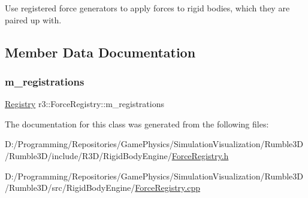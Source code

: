 Use registered force generators to apply forces to rigid bodies, which they are paired up with. 



\subsection{Member Data Documentation}
\mbox{\label{classr3_1_1_force_registry_a36847da26301dc4b18e6b6b25fb2fa51}} 
\subsubsection{\texorpdfstring{m\+\_\+registrations}{m\_registrations}}
{\footnotesize\ttfamily \mbox{\hyperlink{classr3_1_1_force_registry_a91449a71b1a33d773ef787ae56ae9b2d}{Registry}} r3\+::\+Force\+Registry\+::m\+\_\+registrations\hspace{0.3cm}{\ttfamily [protected]}}



The documentation for this class was generated from the following files\+:\begin{DoxyCompactItemize}
\item 
D\+:/\+Programming/\+Repositories/\+Game\+Physics/\+Simulation\+Visualization/\+Rumble3\+D/\+Rumble3\+D/include/\+R3\+D/\+Rigid\+Body\+Engine/\mbox{\hyperlink{_force_registry_8h}{Force\+Registry.\+h}}\item 
D\+:/\+Programming/\+Repositories/\+Game\+Physics/\+Simulation\+Visualization/\+Rumble3\+D/\+Rumble3\+D/src/\+Rigid\+Body\+Engine/\mbox{\hyperlink{_force_registry_8cpp}{Force\+Registry.\+cpp}}\end{DoxyCompactItemize}
